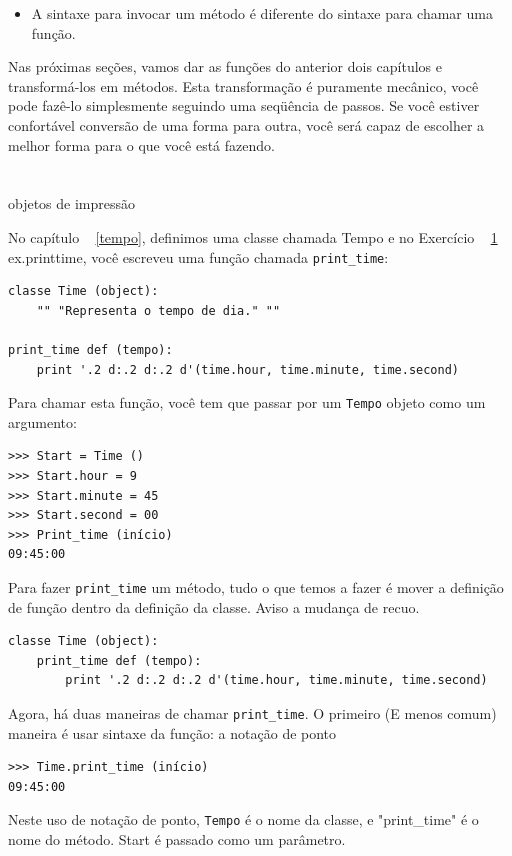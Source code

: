 \documentclass[10pt]{book}
\begin{document}
\begin{v erbatim}
{\begin{itemize}
\item A sintaxe para invocar um método é diferente do
sintaxe para chamar uma função.

\end{itemize}

Nas próximas seções, vamos dar as funções do anterior
dois capítulos e transformá-los em métodos. Esta transformação é
puramente mecânico, você pode fazê-lo simplesmente seguindo uma seqüência de
passos. Se você estiver confortável conversão de uma forma para outra,
você será capaz de escolher a melhor forma para o que você está fazendo.


\section{} objetos de impressão

No capítulo ~ \ref {tempo}, definimos uma classe chamada
{\tt} Tempo e no Exercício ~ \ref {} ex.printtime, você 
escreveu uma função chamada \verb "print_time":

\begin{verbatim}
classe Time (object):
    "" "Representa o tempo de dia." ""

print_time def (tempo):
    print '.2 d:.2 d:.2 d'(time.hour, time.minute, time.second)
\end{verbatim}
%
Para chamar esta função, você tem que passar por um {\tt Tempo} objeto como um
argumento:

\begin{verbatim}
>>> Start = Time ()
>>> Start.hour = 9
>>> Start.minute = 45
>>> Start.second = 00
>>> Print_time (início)
09:45:00
\end{verbatim}
%
Para fazer \verb "print_time" um método, tudo o que temos a fazer é
mover a definição de função dentro da definição da classe. Aviso
a mudança de recuo.

\begin{verbatim}
classe Time (object):
    print_time def (tempo):
        print '.2 d:.2 d:.2 d'(time.hour, time.minute, time.second)
\end{verbatim}
%
Agora, há duas maneiras de chamar \verb "print_time". O primeiro
(E menos comum) maneira é usar sintaxe da função:
\index{} a notação de ponto


\begin{verbatim}
>>> Time.print_time (início)
09:45:00
\end{verbatim}
%
Neste uso de notação de ponto, {\tt Tempo} é o nome da classe,
e \verbo "print_time" é o nome do método. {Start \tt} é
passado como um parâmetro.

}
\end{v erbatim}
\end{document}
